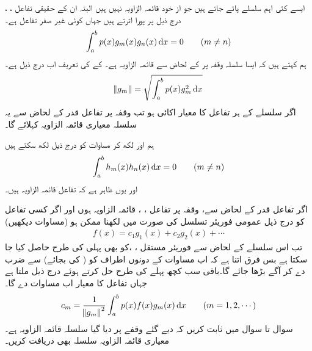 ایسے کئی اہم سلسلے پائے جاتے ہیں جو از خود قائمہ الزاویہ نہیں ہیں البتہ ان کے حقیقی تفاعل ، ،   درج ذیل پر پورا اترتے ہیں جہاں  کوئی غیر صفر تفاعل ہے۔
\begin{align}\label{مساوات_طاقتی_اضافی_عمودی_تفاعل_قدر_الف}
\int_{a}^{b} p(x) g_m(x)g_n(x)\dif x=0\quad \quad (m\ne n)
\end{align}  
ہم کہتے ہیں کہ ایسا سلسلہ وقفہ  پر   کے لحاض سے قائمہ الزاویہ ہے۔ کے  کی تعریف اب درج ذیل ہے۔
\begin{align}\label{مساوات_طاقتی_اضافی_معیار_قدر_تفاعل}
\norm{g_m}=\sqrt{\int_{a}^{b}p(x)g_m^2\dif x}
\end{align}
اگر سلسلے کے ہر تفاعل  کا معیار اکائی  ہو تب وقفہ  پر تفاعل قدر  کے لحاض سے یہ سلسلہ معیاری قائمہ الزاویہ کہلائے گا۔

ہم  اور  لکھ کر مساوات  کو درج ذیل لکھ سکتے ہیں
\begin{align}
\int_{a}^{b}h_m(x)h_n(x)\dif x=0 \quad \quad (m\ne n)
\end{align}
اور یوں ظاہر ہے کہ  تفاعل قائمہ الزاویہ ہیں۔

اگر تفاعل قدر  کے لحاض سے، وقفہ  پر تفاعل ، ،   قائمہ الزاویہ ہوں اور اگر کسی تفاعل  کو درج ذیل عمومی فوریئر تسلسل کی صورت میں لکھنا ممکن ہو (مساوات  دیکھیں)
\begin{align}\label{مساوات_ضمیمہ_اضافی_تفاعل_قدر_تسلسل_الف}
f(x)=c_1g_1(x)+c_2g_2(x)+\cdots
\end{align} 
 تب اس سلسلے کے لحاض سے فوریئر مستقل ، ، کو بھی پہلی کی طرح حاصل کیا جا سکتا ہے بس فرق اتنا ہے کہ اب مساوات
  کے دونوں اطراف کو ( کی بجائے)  سے ضرب دے کر آگے بڑھا جائے گا۔باقی سب کچھ پہلے کی طرح حل کرتے ہوئے درج ذیل ملتا ہے جہاں تفاعل کا معیار اب مساوات  دے گا۔ 
\begin{align}
c_m=\frac{1}{\norm{g_m}^2}\int_{a}^{b}p(x)f(x)g_m(x)\dif x\quad \quad (m=1,2,\cdots)
\end{align} 
سوال  تا سوال  میں ثابت کریں کہ دیے گئے وقفے پر دیا گیا سلسلہ قائمہ الزاویہ ہے۔معیاری قائمہ الزاویہ سلسلہ بھی دریافت کریں۔

